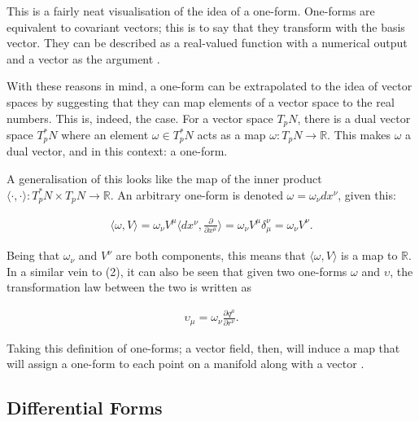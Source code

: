 \documentclass[fleqn, twocolumn, 10pt]{article}
\begin{document}
This is a fairly neat visualisation of the idea of a one-form. One-forms are equivalent to covariant vectors; this is to say that they transform with the basis vector. They can be described as a real-valued function with a numerical output and a vector as the argument \cite{Ian2002Lawrie}.

With these reasons in mind, a one-form can be extrapolated to the idea of vector spaces by suggesting that they can map elements of a vector space to the real numbers. This is, indeed, the case. For a vector space $T_pN$, there is a dual vector space $T_p^*N$ where an element $\omega \in T_p^*N$ acts as a map $\omega: T_pN \to \mathbb{R}$. This makes $\omega$ a dual vector, and in this context: a one-form.

A generalisation of this looks like the map of the inner product $\langle \cdot , \cdot \rangle : T_p^*N \times T_pN \to \mathbb{R}$. An arbitrary one-form is denoted $\omega = \omega_\nu dx^\nu$, given this:

\begin{ceqn}
\begin{align*}
\langle \omega , V \rangle = \omega_\nu V^\mu \langle dx^\nu , \frac{\partial}{\partial x^\mu} \rangle = \omega_\nu V^\mu \delta_\mu^\nu = \omega_\nu V^\nu.
\end{align*}
\end{ceqn}
Being that $\omega_\nu$ and $V^\nu$ are both components, this means that $\langle \omega , V \rangle$ is a map to $\mathbb{R}$. In a similar vein to (2), it can also be seen that given two one-forms $\omega$ and $\upsilon$, the transformation law between the two is written as

\begin{ceqn}
\begin{align*}
\upsilon_\mu = \omega_\nu \frac{\partial q^\mu}{\partial r^\nu}.
\end{align*}
\end{ceqn}

Taking this definition of one-forms; a vector field, then, will induce a map that will assign a one-form to each point on a manifold along with a vector \cite{shnir, nakahara2003geometry, kai2015lam}.


\subsection{Differential Forms}
\end{document}
